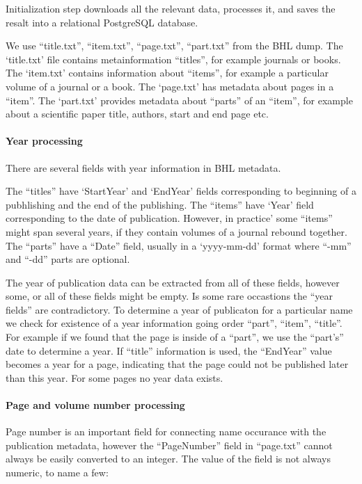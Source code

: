 \documentclass[
]{article}
\begin{document}
Initialization step downloads all the relevant data, processes it, and
saves the resalt into a relational PostgreSQL database.

We use ``title.txt'', ``item.txt'', ``page.txt'', ``part.txt'' from the
BHL dump. The `title.txt' file contains metainformation ``titles'', for
example journals or books. The `item.txt' contains information about
``items'', for example a particular volume of a journal or a book. The
`page.txt' has metadata about pages in a ``item''. The `part.txt'
provides metadata about ``parts'' of an ``item'', for example about a
scientific paper title, authors, start and end page etc.

\hypertarget{year-processing}{%
\paragraph{Year processing}\label{year-processing}}

There are several fields with year information in BHL metadata.

The ``titles'' have `StartYear' and `EndYear' fields corresponding to
beginning of a pubhlishing and the end of the publishing. The ``items''
have `Year' field corresponding to the date of publication. However, in
practice' some ``items'' might span several years, if they contain
volumes of a journal rebound together. The ``parts'' have a ``Date''
field, usually in a `yyyy-mm-dd' format where ``-mm'' and ``-dd'' parts
are optional.

The year of publication data can be extracted from all of these fields,
however some, or all of these fields might be empty. Is some rare
occastions the ``year fields'' are contradictory. To determine a year of
publicaton for a particular name we check for existence of a year
information going order ``part'', ``item'', ``title''. For example if we
found that the page is inside of a ``part'', we use the ``part's'' date
to determine a year. If ``title'' information is used, the ``EndYear''
value becomes a year for a page, indicating that the page could not be
published later than this year. For some pages no year data exists.

\hypertarget{page-and-volume-number-processing}{%
\paragraph{Page and volume number
processing}\label{page-and-volume-number-processing}}

Page number is an important field for connecting name occurance with the
publication metadata, however the ``PageNumber'' field in ``page.txt''
cannot always be easily converted to an integer. The value of the field
is not always numeric, to name a few:
\end{document}
